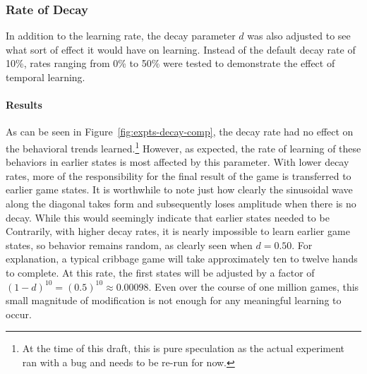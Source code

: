 
\subsubsection*{Rate of Decay}
\label{sec:findings-expts-decay}

In addition to the learning rate,
the decay parameter $d$ was also adjusted to see what sort of effect it
would have on learning.
%
Instead of the default decay rate of 10\%,
rates ranging from 0\% to 50\%
were tested to demonstrate the effect of temporal learning.

\paragraph*{Results}


As can be seen in Figure~\ref{fig:expts-decay-comp},
the decay rate had no effect on the behavioral trends learned.\footnote{
	At the time of this draft,
	this is pure speculation as the actual experiment ran with a bug and needs
	to be re-run for now.
}
%
However,
as expected,
the rate of learning of these behaviors in earlier states is most affected
by this parameter.
%
With lower decay rates,
more of the responsibility for the final result of the game is transferred
to earlier game states.
%
It is worthwhile to note just how clearly
the sinusoidal wave along the diagonal takes form
and subsequently loses amplitude
when there is no decay.
%
While this would seemingly indicate that earlier states needed to be
%
Contrarily,
with higher decay rates,
it is nearly impossible to learn earlier game states,
so behavior remains random,
as clearly seen when $d = 0.50$.
%
For explanation,
a typical cribbage game will take approximately ten to twelve hands
to complete.
%
At this rate,
the first states will be adjusted by a factor of
$(1-d)^{10} = (0.5)^{10} \approx 0.00098$.
%
Even over the course of one million games,
this small magnitude of modification is not enough
for any meaningful learning to occur.



